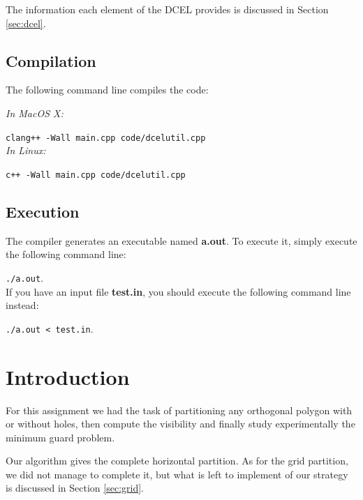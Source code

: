 \documentclass[12pt,a4paper,oneside]{article}
\begin{document}
The information each element of the DCEL provides is discussed in Section \ref{sec:dcel}.

\subsection{Compilation}\label{subsec:compile}

The following command line compiles the code:

\textit{In MacOS X:}

\texttt{clang++ -Wall main.cpp code/dcelutil.cpp}\\

\textit{In Linux:}

\texttt{c++ -Wall main.cpp code/dcelutil.cpp}

\subsection{Execution}

The compiler generates an executable named \textbf{a.out}. To execute it, simply execute the following command line:

\texttt{./a.out}.\\

If you have an input file \textbf{test.in}, you should execute the following command line instead:

\texttt{./a.out < test.in}.

\section{Introduction}\label{sec:intro}
For this assignment we had the task of partitioning any orthogonal polygon with or without holes, then compute the visibility and finally study experimentally the minimum guard problem. 

Our algorithm gives the complete horizontal partition. As for the grid partition, we did not manage to complete it, but what is left to implement of our strategy is discussed in Section \ref{sec:grid}.

\end{document}
